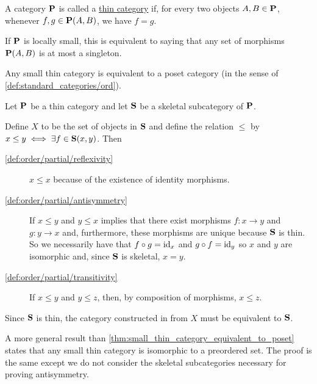 \begin{definition}\label{def:thin_category}\cite{nLab:thin_category}
  A category $\operatorname{\mathbf{P}}$ is called a \uline{thin category} if, for every two objects $A, B \in \operatorname{\mathbf{P}}$, whenever $f, g \in \operatorname{\mathbf{P}}(A, B)$, we have $f = g$.

  If $\operatorname{\mathbf{P}}$ is locally small, this is equivalent to saying that any set of morphisms $\operatorname{\mathbf{P}}(A, B)$ is at most a singleton.
\end{definition}

\begin{proposition}\label{thm:small_thin_category_equivalent_to_poset}
  Any small thin category is equivalent to a poset category (in the sense of \cref{def:standard_categories/ord}).
\end{proposition}
\begin{definition}
  Let $\operatorname{\mathbf{P}}$ be a thin category and let $\operatorname{\mathbf{S}}$ be a skeletal subcategory of $\operatorname{\mathbf{P}}$.

  Define $X$ to be the set of objects in $\operatorname{\mathbf{S}}$ and define the relation $\leq$ by $x \leq y \iff \exists f \in \operatorname{\mathbf{S}}(x, y)$. Then
  \begin{description}
    \item[\ref{def:order/partial/reflexivity}] $x \leq x$ because of the existence of identity morphisms.
    \item[\ref{def:order/partial/antisymmetry}] If $x \leq y$ and $y \leq x$ implies that there exist morphisms $f: x \to y$ and $g: y \to x$ and, furthermore, these morphisms are unique because $\operatorname{\mathbf{S}}$ is thin. So we necessarily have that $f \circ g = \operatorname{id}_x$ and $g \circ f = \operatorname{id}_y$ so $x$ and $y$ are isomorphic and, since $\operatorname{\mathbf{S}}$ is skeletal, $x = y$.
    \item[\ref{def:order/partial/transitivity}] If $x \leq y$ and $y \leq z$, then, by composition of morphisms, $x \leq z$.
  \end{description}

  Since $\operatorname{\mathbf{S}}$ is thin, the category constructed in from $X$ must be equivalent to $\operatorname{\mathbf{S}}$.
\end{definition}

\begin{note}\label{note:small_thin_category_isomorphic_to_preorder}
  A more general result than \cref{thm:small_thin_category_equivalent_to_poset} states that any small thin category is isomorphic to a preordered set. The proof is the same except we do not consider the skeletal subcategories necessary for proving antisymmetry.
\end{note}
